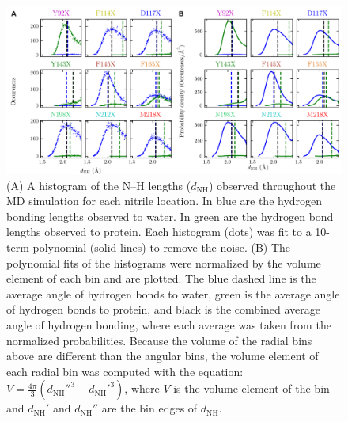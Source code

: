 \begin{figure}
    \center
    \includegraphics[width=\double]{figures-gfp-hbond/FigureS5_combined.png}
    \caption{
        (A) A histogram of the N--H lengths ($d_{\text{NH}}$) observed throughout the MD simulation for each nitrile location. 
        In blue are the hydrogen bonding lengths observed to water. 
        In green are the hydrogen bond lengths observed to protein. 
        Each histogram (dots) was fit to a 10-term polynomial (solid lines) to remove the noise. 
        (B) The polynomial fits of the histograms were normalized by the volume element of each bin and are plotted. 
        The blue dashed line is the average angle of hydrogen bonds to water, green is the average angle of hydrogen bonds to protein, and black is the combined average angle of hydrogen bonding, where each average was taken from the normalized probabilities. 
        Because the volume of the radial bins above are different than the angular bins, the volume element of each radial bin was computed with the equation: 
    $V = \frac{4\pi}{3}\left ( d_{\text{NH}}''^3 - d_{\text{NH}}'^3 \right )$, 
    where $V$ is the volume element of the bin and $d_{\text{NH}}'$ and $d_{\text{NH}}''$ are the bin edges of $d_{\text{NH}}$.
    }
    \label{fig:hbond-hist_dist}
\end{figure}

